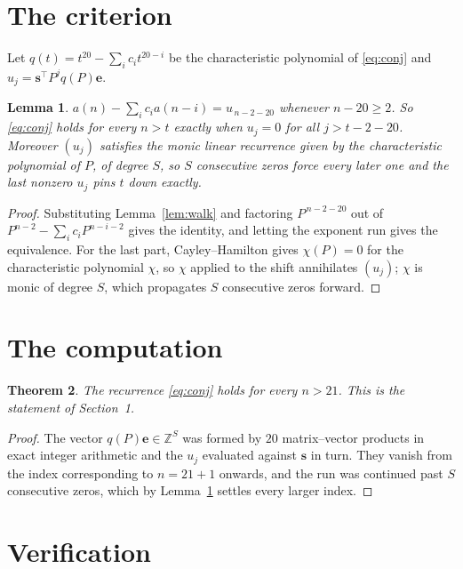 \documentclass[11pt,a4paper]{article}
\theoremstyle{plain}
\newtheorem{theorem}{Theorem}
\newtheorem{lemma}[theorem]{Lemma}
\theoremstyle{definition}
\begin{document}
\section{The criterion}

Let $q(t)=t^{20}-\sum_i c_i t^{20-i}$ be the characteristic polynomial of
\eqref{eq:conj} and $u_j=\mathbf{s}^{\!\top}P^{j}q(P)\mathbf{e}$.

\begin{lemma}\label{lem:crit}
$a(n)-\sum_i c_i a(n-i)=u_{\,n-2-20}$ whenever $n-20\ge2$. So \eqref{eq:conj}
holds for every $n>t$ exactly when $u_j=0$ for all $j>t-2-20$. Moreover $(u_j)$
satisfies the monic linear recurrence given by the characteristic polynomial of $P$, of
degree $S$, so $S$ consecutive zeros force every later one and the last nonzero $u_j$ pins
$t$ down exactly.
\end{lemma}

\begin{proof}
Substituting Lemma~\ref{lem:walk} and factoring $P^{\,n-2-20}$ out of
$P^{n-2}-\sum_i c_i P^{n-i-2}$ gives the identity, and letting the exponent run gives the
equivalence. For the last part, Cayley--Hamilton gives $\chi(P)=0$ for the characteristic
polynomial $\chi$, so $\chi$ applied to the shift annihilates $(u_j)$; $\chi$ is monic of
degree $S$, which propagates $S$ consecutive zeros forward.
\end{proof}

\section{The computation}

\begin{theorem}
The recurrence \eqref{eq:conj} holds for every $n>21$. This is the statement of
Section~1.
\end{theorem}

\begin{proof}
The vector $q(P)\mathbf{e}\in\mathbb{Z}^{S}$ was formed by $20$ matrix--vector
products in exact integer arithmetic and the $u_j$ evaluated against $\mathbf{s}$ in turn.
They vanish from the index corresponding to $n=21+1$ onwards, and the run was continued
past $S$ consecutive zeros, which by Lemma~\ref{lem:crit} settles every larger index.
\end{proof}

\section{Verification}
\end{document}
